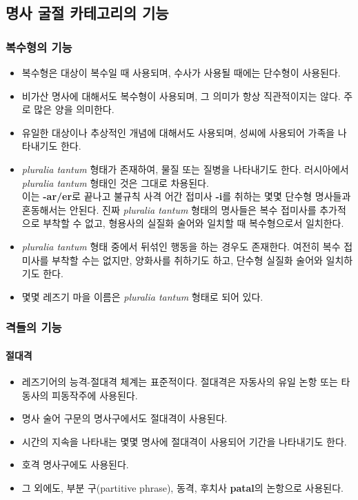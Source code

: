 \subsection{명사 굴절 카테고리의 기능}
\subsubsection{복수형의 기능}
\begin{itemize}
\item 복수형은 대상이 복수일 때 사용되며, 수사가 사용될 때에는 단수형이 사용된다.
\item 비가산 명사에 대해서도 복수형이 사용되며, 그 의미가 항상 직관적이지는 않다. 주로 많은 양을 의미한다.
\item 유일한 대상이나 추상적인 개념에 대해서도 사용되며, 성씨에 사용되어 가족을 나타내기도 한다.
\item \textit{pluralia tantum} 형태가 존재하여, 물질 또는 질병을 나타내기도 한다. 러시아에서  \textit{pluralia tantum} 형태인 것은 그대로 차용된다.\\
\NB \quad 이는 \textbf{-ar/er}로 끝나고 불규칙 사격 어간 접미사 \textbf{-i}를 취하는 몇몇 단수형 명사들과 혼동해서는 안된다. 진짜 \textit{pluralia tantum} 형태의 명사들은 복수 접미사를 추가적으로 부착할 수 없고, 형용사의 실질화 술어와 일치할 때 복수형으로서 일치한다.

\item \textit{pluralia tantum} 형태 중에서 뒤섞인 행동을 하는 경우도 존재한다. 여전히 복수 접미사를 부착할 수는 없지만, 양화사를 취하기도 하고, 단수형 실질화 술어와 일치하기도 한다.
\item 몇몇 레즈기 마을 이름은 \textit{pluralia tantum} 형태로 되어 있다.

\end{itemize}

\subsubsection{격들의 기능}
\paragraph{절대격}
\begin{itemize}
\item 레즈기어의 능격-절대격 체계는 표준적이다. 절대격은 자동사의 유일 논항 또는 타동사의 피동작주에 사용된다.
\item 명사 술어 구문의 명사구에서도 절대격이 사용된다.
\item 시간의 지속을 나타내는 몇몇 명사에 절대격이 사용되어 기간을 나타내기도 한다. 
\item 호격 명사구에도 사용된다.
\item 그 외에도, 부분 구(partitive phrase), 동격, 후치사 \textbf{patal}의 논항으로 사용된다.
\end{itemize}
